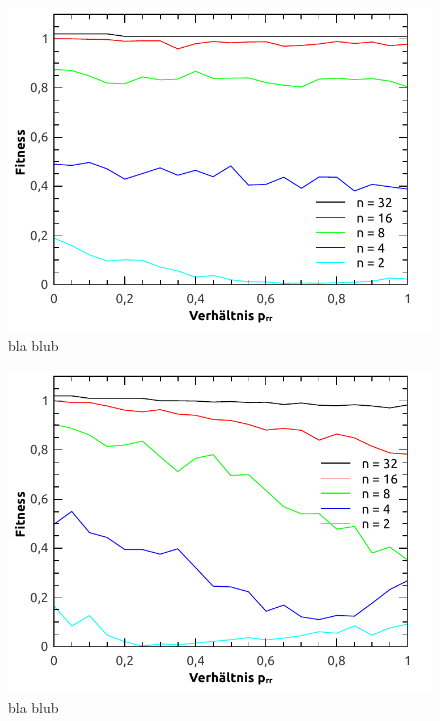\documentclass[12pt,
    a4paper,
    headinclude,
    footinclude]{scrartcl}
\begin{document}
	
	\begin{figure}[!h]
		\begin{center}
			\includegraphics[width=\size\textwidth]{../vortrag/abbildungen/constant_allDim_average.pdf}
			\caption{bla blub}
		\end{center}
	\end{figure}
	
	\begin{figure}[!h]
		\begin{center}
			\includegraphics[width=\size\textwidth]{../vortrag/abbildungen/increasing_allDim_average.pdf}
			\caption{bla blub}
		\end{center}
	\end{figure}
	
\end{document}
